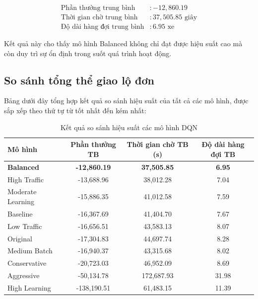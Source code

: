 \begin{align}
    \text{Phần thưởng trung bình}     & : -12,860.19             \\
    \text{Thời gian chờ trung bình}   & : 37,505.85 \text{ giây} \\
    \text{Độ dài hàng đợi trung bình} & : 6.95 \text{ xe}
\end{align}

Kết quả này cho thấy mô hình Balanced không chỉ đạt được hiệu suất cao mà còn duy
trì sự ổn định trong suốt quá trình hoạt động.

\subsection{So sánh tổng thể giao lộ đơn}

Bảng dưới đây tổng hợp kết quả so sánh hiệu suất của tất cả các mô hình, được sắp
xếp theo thứ tự từ tốt nhất đến kém nhất:

\begin{table}[!htp]
    \centering
    \caption{Kết quả so sánh hiệu suất các mô hình DQN}
    \label{tab:model_performance_comparison}
    \begin{tabular}{@{}lccc@{}}
        \toprule \textbf{Mô hình}  & \textbf{Phần thưởng TB} & \textbf{Thời gian chờ TB (s)} & \textbf{Độ dài hàng đợi TB} \\
        \midrule \textbf{Balanced} & \textbf{-12,860.19}     & \textbf{37,505.85}            & \textbf{6.95}               \\
        High Traffic               & -13,688.96              & 38,012.28                     & 7.04                        \\
        Moderate Learning          & -15,886.35              & 41,012.58                     & 7.59                        \\
        Baseline                   & -16,367.69              & 41,404.70                     & 7.67                        \\
        Low Traffic                & -16,656.51              & 43,583.13                     & 8.07                        \\
        Original                   & -17,304.83              & 44,697.74                     & 8.28                        \\
        Medium Batch               & -16,940.37              & 43,315.68                     & 8.02                        \\
        Conservative               & -20,723.03              & 46,952.09                     & 8.69                        \\
        Aggressive                 & -50,134.78              & 172,687.93                    & 31.98                       \\
        High Learning              & -138,190.51             & 61,483.15                     & 11.39                       \\
        \bottomrule
    \end{tabular}
\end{table}

